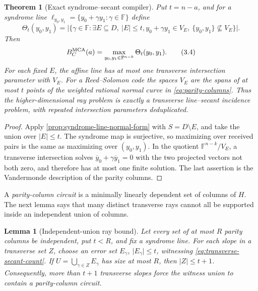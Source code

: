 \documentclass[11pt,a4paper]{amsart}
\numberwithin{equation}{section}
\newtheorem{theorem}{Theorem}[section]
\newtheorem{lemma}[lemma]{Lemma}
\theoremstyle{remark}
\newcommand{\F}{\mathbb F}
\newcommand{\abs}[1]{\lvert #1\rvert}
\begin{document}
\begin{theorem}[Exact syndrome--secant compiler]
\label{thm:syndrome-secant-exact}
Put \(t=n-a\), and for a syndrome line
\(\ell_{y_0,y_1}=\{y_0+\gamma y_1:\gamma\in\F\}\) define
\[
 \Theta_t(y_0,y_1)=
 \abs{\{\gamma\in\F:\exists E\subseteq D,\ \abs E\le t,
 y_0+\gamma y_1\in V_E,
 \ \{y_0,y_1\}\not\subseteq V_E\}}.
 \tag{3.3}\label{eq:transverse-secant-count}
\]
Then
\[
 B_C^{\rm MCA}(a)=\max_{y_0,y_1\in\F^{n-k}}
                    \Theta_t(y_0,y_1).
 \tag{3.4}\label{eq:exact-secant-numerator}
\]
For each fixed \(E\), the affine line has at most one transverse
intersection parameter with \(V_E\).  For a Reed--Solomon code the
spaces \(V_E\) are the spans of at most \(t\) points of the weighted
rational normal curve in \eqref{eq:parity-columns}.  Thus the
higher-dimensional ray problem is exactly a transverse line--secant
incidence problem, with repeated intersection parameters deduplicated.
\end{theorem}

\begin{proof}
Apply \cref{prop:syndrome-line-normal-form} with \(S=D\setminus E\), and
take the union over \(\abs E\le t\).  The syndrome map is surjective, so
maximizing over received pairs is the same as maximizing over
\((y_0,y_1)\).  In the quotient \(\F^{n-k}/V_E\), a transverse
intersection solves
\(\overline y_0+\gamma\overline y_1=0\) with the two projected vectors
not both zero, and therefore has at most one finite solution.  The last
assertion is the Vandermonde description of the parity columns.
\end{proof}

A \emph{parity-column circuit} is a minimally linearly dependent set of
columns of \(H\).  The next lemma says that many distinct transverse rays
cannot all be supported inside an independent union of columns.

\begin{lemma}[Independent-union ray bound]
\label{lem:independent-union-rays}
Let every set of at most \(R\) parity columns be independent, put
\(t<R\), and fix a syndrome line.  For each slope in a transverse set
\(Z\), choose an error set \(E_\gamma\), \(\abs{E_\gamma}\le t\),
witnessing \eqref{eq:transverse-secant-count}.  If
\(U=\bigcup_{\gamma\in Z}E_\gamma\) has size at most \(R\), then
\(\abs Z\le t+1\).  Consequently, more than \(t+1\) transverse slopes
force the witness union to contain a parity-column circuit.
\end{lemma}
\end{document}
